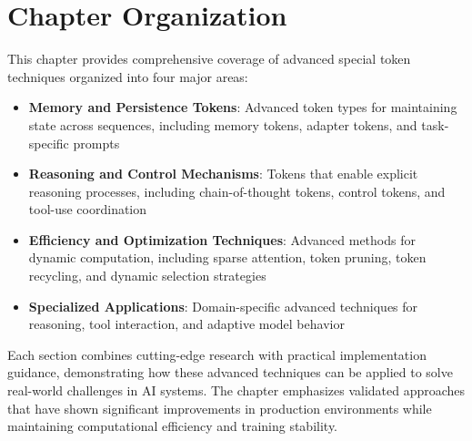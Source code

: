 \section{Chapter Organization}

This chapter provides comprehensive coverage of advanced special token techniques organized into four major areas:

\begin{itemize}
\item \textbf{Memory and Persistence Tokens}: Advanced token types for maintaining state across sequences, including memory tokens, adapter tokens, and task-specific prompts
\item \textbf{Reasoning and Control Mechanisms}: Tokens that enable explicit reasoning processes, including chain-of-thought tokens, control tokens, and tool-use coordination
\item \textbf{Efficiency and Optimization Techniques}: Advanced methods for dynamic computation, including sparse attention, token pruning, token recycling, and dynamic selection strategies
\item \textbf{Specialized Applications}: Domain-specific advanced techniques for reasoning, tool interaction, and adaptive model behavior
\end{itemize}

Each section combines cutting-edge research with practical implementation guidance, demonstrating how these advanced techniques can be applied to solve real-world challenges in AI systems. The chapter emphasizes validated approaches that have shown significant improvements in production environments while maintaining computational efficiency and training stability.